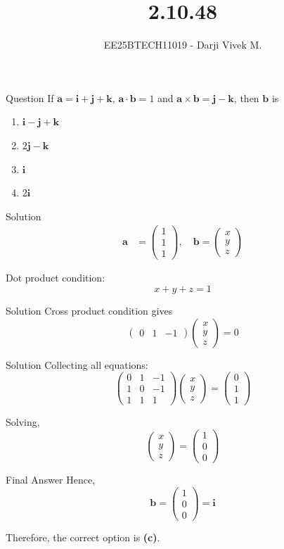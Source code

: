 \documentclass{beamer}
\title{2.10.48}
\author{EE25BTECH11019 - Darji Vivek M.}
\date{}
\newcommand{\myvec}[1]{\begin{pmatrix}#1\end{pmatrix}}
\renewcommand{\vec}[1]{\mathbf{#1}}
\begin{document}
\frame{\titlepage}

\begin{frame}{Question}
If $\vec{a} = \vec{i}+\vec{j}+\vec{k}$, $\vec{a}\cdot\vec{b}=1$ and $\vec{a}\times\vec{b}=\vec{j}-\vec{k}$, then $\vec{b}$ is 
\begin{multicols}{2}
\begin{enumerate}[label=(\alph*)]
\item $\vec{i}-\vec{j}+\vec{k}$  
\item $2\vec{j}-\vec{k}$  
\item $\vec{i}$  
\item $2\vec{i}$  
\end{enumerate}
\end{multicols}
\end{frame}

\begin{frame}{Solution}
\begin{align}
\vec{a} &= \myvec{1\\1\\1}, \quad 
\vec{b} = \myvec{x\\y\\z}
\end{align}

Dot product condition:
\[
x+y+z=1
\]
\end{frame}

\begin{frame}{Solution}
Cross product condition gives
\[
\myvec{0 & 1 & -1}\myvec{x\\y\\z}=0
\]
\end{frame}

\begin{frame}{Solution}
Collecting all equations:
\[
\myvec{0 & 1 & -1\\ 1 & 0 & -1\\ 1 & 1 & 1}\myvec{x\\y\\z}=\myvec{0\\1\\1}
\]

Solving,
\[
\myvec{x\\y\\z}=\myvec{1\\0\\0}
\]
\end{frame}

\begin{frame}{Final Answer}
Hence,
\[
\vec{b}=\myvec{1\\0\\0}=\vec{i}
\]

Therefore, the correct option is \textbf{(c)}.
\end{frame}
\end{document}
